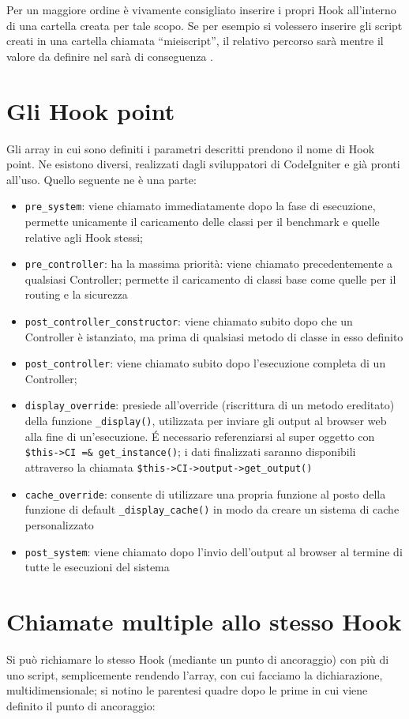 Per un maggiore ordine è vivamente consigliato inserire i propri Hook all'interno di una cartella creata per tale scopo. Se per esempio si volessero inserire gli script creati in una cartella chiamata ``mieiscript'', il relativo percorso sarà  mentre il valore da definire nel  sarà di conseguenza .

\section*{Gli Hook point}
Gli array in cui sono definiti i parametri descritti prendono il nome di Hook point. Ne esistono diversi, realizzati dagli sviluppatori di CodeIgniter e già pronti all'uso. Quello seguente ne è una parte:

\begin{itemize}
\item \verb|pre_system|: viene chiamato immediatamente dopo la fase di esecuzione, permette unicamente il caricamento delle classi per il benchmark e quelle relative agli Hook stessi;
\item \verb|pre_controller|: ha la massima priorità: viene chiamato precedentemente a qualsiasi Controller; permette il caricamento di classi base come quelle per il routing e la sicurezza
\item \verb|post_controller_constructor|: viene chiamato subito dopo che un Controller è istanziato, ma prima di qualsiasi metodo di classe in esso definito
\item \verb|post_controller|: viene chiamato subito dopo l'esecuzione completa di un Controller;
\item \verb|display_override|: presiede all'override (riscrittura di un metodo ereditato) della funzione \verb|_display()|, utilizzata per inviare gli output al browser web alla fine di un'esecuzione. \'E necessario referenziarsi al super oggetto con \verb|$this->CI =& get_instance()|; i dati finalizzati saranno disponibili attraverso la chiamata \verb|$this->CI->output->get_output()|
\item \verb|cache_override|: consente di utilizzare una propria funzione al posto della funzione di default \verb|_display_cache()| in modo da creare un sistema di cache personalizzato
\item \verb|post_system|: viene chiamato dopo l'invio dell'output al browser al termine di tutte le esecuzioni del sistema
\end{itemize} 

\section*{Chiamate multiple allo stesso Hook}
Si può richiamare lo stesso Hook (mediante un punto di ancoraggio) con più di uno script, semplicemente rendendo l'array, con cui facciamo la dichiarazione, multidimensionale; si notino le parentesi quadre dopo le prime in cui viene definito il punto di ancoraggio:

